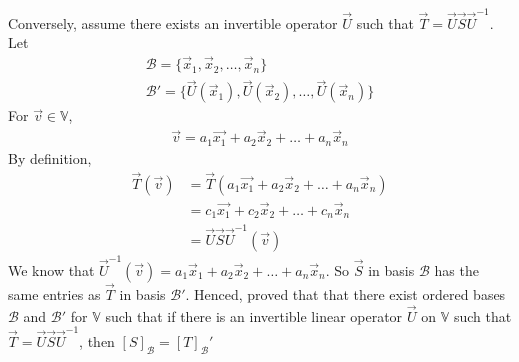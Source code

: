 \documentclass[journal,12pt,twocolumn]{IEEEtran}
\begin{document}
Conversely, assume there exists an invertible operator $\vec{U}$ such that $\vec{T} = \vec{U}\vec{S}\vec{U}^{-1}$. Let
\begin{align}
    \mathcal{B} = \{\vec{x}_1,\vec{x}_2,\ldots,\vec{x}_n\}\nonumber\\
    \mathcal{B}' = \{\vec{U}(\vec{x}_1),\vec{U}(\vec{x}_2),\ldots,\vec{U}(\vec{x}_n)\}\nonumber
\end{align}
For $\vec{v} \in \mathbb V$,
\begin{align}
    \vec{v} = a_1\vec{x_1} + a_2\vec{x}_2 + \ldots + a_n\vec{x}_n
\end{align}
By definition,
\begin{align}
    \vec{T}(\vec{v}) & = \vec{T}(a_1\vec{x_1} + a_2\vec{x}_2 + \ldots + a_n\vec{x}_n)\\&
    = c_1\vec{x_1} + c_2\vec{x}_2 + \ldots + c_n\vec{x}_n \\&
    = \vec{U}\vec{S}\vec{U}^{-1}(\vec{v})
\end{align}
We know that $\vec{U}^{-1}(\vec{v}) = a_1\vec{x}_1 + a_2\vec{x}_2 + \ldots + a_n\vec{x}_n$. So $\vec{S}$ in basis $\mathcal{B}$ has the same entries as $\vec{T}$ in basis $\mathcal{B}'$.
Henced, proved that that there exist ordered bases $\mathcal{B}$ and $\mathcal{B}'$ for $\mathbb V$ such that if there is an invertible linear operator $\vec{U}$ on $\mathbb V$ such that $\vec{T} = \vec{U}\vec{S}\vec{U}^{-1}$, then $[S]_\mathcal{B} = [T]_\mathcal{B}'$
\end{document}

